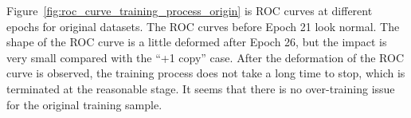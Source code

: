 \documentclass[12pt]{article}
\begin{document}
			Figure~\ref{fig:roc_curve_training_process_origin} is ROC curves at different epochs for original datasets. The ROC curves before Epoch 21 look normal. The shape of the ROC curve is a little deformed after Epoch 26, but the impact is very small compared with the ``+1 copy'' case. After the deformation of the ROC curve is observed, the training process does not take a long time to stop, which is terminated at the reasonable stage. It seems that there is no over-training issue for the original training sample.
			\begin{figure}[htpb]
				\centering
				 \\
\end{figure}
\end{document}
